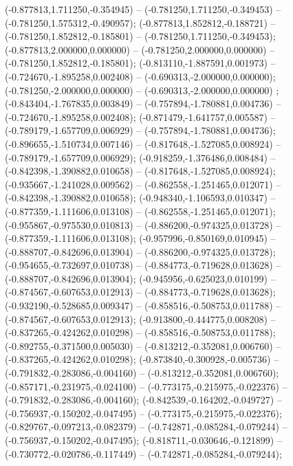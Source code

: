  (-0.877813,1.711250,-0.354945) -- (-0.781250,1.711250,-0.349453) -- (-0.781250,1.575312,-0.490957);
 (-0.877813,1.852812,-0.188721) -- (-0.781250,1.852812,-0.185801) -- (-0.781250,1.711250,-0.349453);
 (-0.877813,2.000000,0.000000) -- (-0.781250,2.000000,0.000000) -- (-0.781250,1.852812,-0.185801);
 (-0.813110,-1.887591,0.001973) -- (-0.724670,-1.895258,0.002408) -- (-0.690313,-2.000000,0.000000);
 (-0.781250,-2.000000,0.000000) -- (-0.690313,-2.000000,0.000000) ;
 (-0.843404,-1.767835,0.003849) -- (-0.757894,-1.780881,0.004736) -- (-0.724670,-1.895258,0.002408);
 (-0.871479,-1.641757,0.005587) -- (-0.789179,-1.657709,0.006929) -- (-0.757894,-1.780881,0.004736);
 (-0.896655,-1.510734,0.007146) -- (-0.817648,-1.527085,0.008924) -- (-0.789179,-1.657709,0.006929);
 (-0.918259,-1.376486,0.008484) -- (-0.842398,-1.390882,0.010658) -- (-0.817648,-1.527085,0.008924);
 (-0.935667,-1.241028,0.009562) -- (-0.862558,-1.251465,0.012071) -- (-0.842398,-1.390882,0.010658);
 (-0.948340,-1.106593,0.010347) -- (-0.877359,-1.111606,0.013108) -- (-0.862558,-1.251465,0.012071);
 (-0.955867,-0.975530,0.010813) -- (-0.886200,-0.974325,0.013728) -- (-0.877359,-1.111606,0.013108);
 (-0.957996,-0.850169,0.010945) -- (-0.888707,-0.842696,0.013904) -- (-0.886200,-0.974325,0.013728);
 (-0.954655,-0.732697,0.010738) -- (-0.884773,-0.719628,0.013628) -- (-0.888707,-0.842696,0.013904);
 (-0.945956,-0.625023,0.010199) -- (-0.874567,-0.607653,0.012913) -- (-0.884773,-0.719628,0.013628);
 (-0.932190,-0.528685,0.009347) -- (-0.858516,-0.508753,0.011788) -- (-0.874567,-0.607653,0.012913);
 (-0.913800,-0.444775,0.008208) -- (-0.837265,-0.424262,0.010298) -- (-0.858516,-0.508753,0.011788);
 (-0.892755,-0.371500,0.005030) -- (-0.813212,-0.352081,0.006760) -- (-0.837265,-0.424262,0.010298);
 (-0.873840,-0.300928,-0.005736) -- (-0.791832,-0.283086,-0.004160) -- (-0.813212,-0.352081,0.006760);
 (-0.857171,-0.231975,-0.024100) -- (-0.773175,-0.215975,-0.022376) -- (-0.791832,-0.283086,-0.004160);
 (-0.842539,-0.164202,-0.049727) -- (-0.756937,-0.150202,-0.047495) -- (-0.773175,-0.215975,-0.022376);
 (-0.829767,-0.097213,-0.082379) -- (-0.742871,-0.085284,-0.079244) -- (-0.756937,-0.150202,-0.047495);
 (-0.818711,-0.030646,-0.121899) -- (-0.730772,-0.020786,-0.117449) -- (-0.742871,-0.085284,-0.079244);
